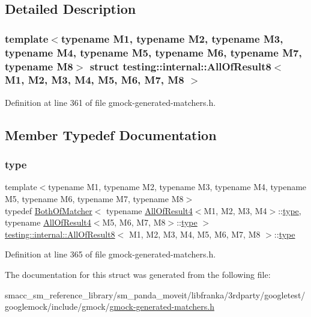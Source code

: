 \subsection{Detailed Description}
\subsubsection*{template$<$typename M1, typename M2, typename M3, typename M4, typename M5, typename M6, typename M7, typename M8$>$\newline
struct testing\+::internal\+::\+All\+Of\+Result8$<$ M1, M2, M3, M4, M5, M6, M7, M8 $>$}



Definition at line 361 of file gmock-\/generated-\/matchers.\+h.



\subsection{Member Typedef Documentation}
\mbox{\label{structtesting_1_1internal_1_1AllOfResult8_a7103892a28c35221b9e62e871c577727}} 
\subsubsection{\texorpdfstring{type}{type}}
{\footnotesize\ttfamily template$<$typename M1, typename M2, typename M3, typename M4, typename M5, typename M6, typename M7, typename M8$>$ \\
typedef \hyperlink{classtesting_1_1internal_1_1BothOfMatcher}{Both\+Of\+Matcher}$<$ typename \hyperlink{structtesting_1_1internal_1_1AllOfResult4}{All\+Of\+Result4}$<$M1, M2, M3, M4$>$\+::\hyperlink{structtesting_1_1internal_1_1AllOfResult8_a7103892a28c35221b9e62e871c577727}{type}, typename \hyperlink{structtesting_1_1internal_1_1AllOfResult4}{All\+Of\+Result4}$<$M5, M6, M7, M8$>$\+::\hyperlink{structtesting_1_1internal_1_1AllOfResult8_a7103892a28c35221b9e62e871c577727}{type} $>$ \hyperlink{structtesting_1_1internal_1_1AllOfResult8}{testing\+::internal\+::\+All\+Of\+Result8}$<$ M1, M2, M3, M4, M5, M6, M7, M8 $>$\+::\hyperlink{structtesting_1_1internal_1_1AllOfResult8_a7103892a28c35221b9e62e871c577727}{type}}



Definition at line 365 of file gmock-\/generated-\/matchers.\+h.



The documentation for this struct was generated from the following file\+:\begin{DoxyCompactItemize}
\item 
smacc\+\_\+sm\+\_\+reference\+\_\+library/sm\+\_\+panda\+\_\+moveit/libfranka/3rdparty/googletest/googlemock/include/gmock/\hyperlink{gmock-generated-matchers_8h}{gmock-\/generated-\/matchers.\+h}\end{DoxyCompactItemize}
